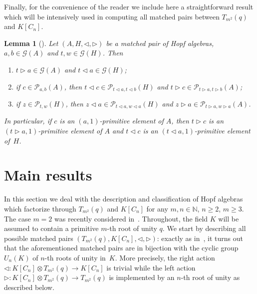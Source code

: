 \documentclass[11pt]{article}
\numberwithin{equation}{section}
\newtheorem{Lemma}[Theorem]{Lemma}
\begin{document}
Finally, for the convenience of the reader we include here a straightforward result which will be intensively used in computing all matched pairs between $T_{m^{2}}(q)$ and $K[C_{n}]$.
\begin{Lemma}[{\cite[Lemma 4.1]{abm}}]\label{primitive}
Let $(A, H, \triangleleft, \triangleright)$ be a matched pair of Hopf algebras, $a, b \in \mathcal{G}(A)$ and $t, w\in \mathcal{G}(H)$. Then
\begin{enumerate}\itemsep=0pt
\item[$(1)$] $t \triangleright a \in \mathcal{G}(A)$ and $t\triangleleft a \in \mathcal{G}(H)$;

\item[$(2)$] if $c \in \mathcal{P}_{a, b}(A)$, then $t \triangleleft c \in \mathcal{P}_{t\triangleleft a, t\triangleleft b} (H)$ and
$t \triangleright c \in \mathcal{P}_{t\triangleright a, t\triangleright b} (A)$;

\item[$(3)$] if $z \in \mathcal{P}_{t, w}(H)$, then $z \triangleleft a \in \mathcal{P}_{t\triangleleft a, w\triangleleft a} (H)$ and $z \triangleright a \in \mathcal{P}_{t\triangleright a, w\triangleright a} (A)$.
\end{enumerate}
In particular, if $c$ is an $(a, 1)$-primitive element of $A$, then $t \triangleright c$ is an $(t\triangleright a, 1)$-primitive element of $A$ and $t \triangleleft c$ is an $(t\triangleleft a, 1)$-primitive element of~$H$.
\end{Lemma}

\section{Main results}\label{2}

In this section we deal with the description and classification of Hopf algebras which factorize through $T_{m^{2}}(q)$ and $K[C_{n}]$ for any $m, n \in \mathbb{N}$, $n \geqslant 2$, $m \geqslant 3$. The case $m = 2$ was recently considered in~\cite{abm}. Throughout, the field $K$ will be assumed to contain a primitive $m$-th root of unity $q$. We start by describing all possible matched pairs $(T_{m^{2}}(q), K[C_n], \triangleleft,
\triangleright)$: exactly as in~\cite{abm}, it turns out that the aforementioned matched pairs are in bijection with the cyclic group~$U_n (K)$ of
$n$-th roots of unity in~$K$. More precisely, the right action $\triangleleft \colon K[C_{n}] \otimes T_{m^{2}}(q) \to K[C_{n}]$ is trivial while
the left action $\triangleright \colon K[C_{n}] \otimes T_{m^{2}}(q) \to T_{m^{2}}(q)$ is implemented by an $n$-th root of unity as described below.
\end{document}
